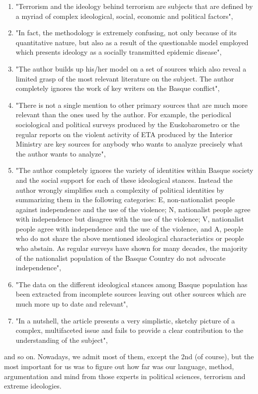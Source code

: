 \begin{enumerate}
\item "Terrorism and the ideology behind terrorism are subjects that are defined by a myriad of complex ideological, social, economic and political factors",
\item "In fact, the methodology is extremely confusing, not only because of its quantitative nature, but also as a result of the questionable model employed which presents ideology as a socially transmitted epidemic disease",
\item "The author builds up his/her model on a set of sources which also reveal a limited grasp of the most relevant literature on the subject. The author completely ignores the work of key writers on the Basque conflict",
\item "There is not a single mention to other primary sources that are much more relevant than the ones used by the author. For example, the periodical sociological and political surveys produced by the Euskobarometro or the regular reports on the
violent activity of ETA produced by the Interior Ministry are key sources for anybody who wants to analyze precisely what the author wants to analyze",
\item "The author completely ignores the variety of identities within Basque society and the social support for each of these ideological stances. Instead the author wrongly simplifies such a complexity of political identities by summarizing them in the following categories:  E, non-nationalist people against independence and the use of the violence; N, nationalist people agree with independence but disagree with the use of the violence; V, nationalist people agree with independence and the use of the
violence, and A, people who do not share the above mentioned ideological characteristics or people who abstain. As regular surveys have shown for many decades, the majority of the nationalist population of the Basque Country do not advocate independence",
\item "The data on the different ideological stances among Basque population has been extracted from incomplete sources leaving out other sources which are much more up to date and relevant",
\item "In a nutshell, the article presents a very simplistic, sketchy picture of a complex, multifaceted issue and fails to provide a clear contribution to the understanding of the subject",
\end{enumerate}

and so on. Nowadays, we admit most of them, except the 2nd (of course), but the most important for us was to figure out how far was our language, method, argumentation and mind from those experts in political sciences, terrorism and extreme ideologies. 

